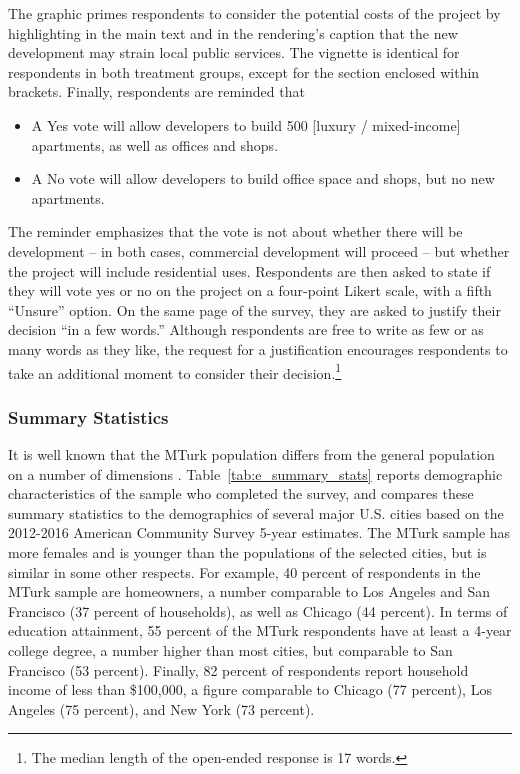 \documentclass[article,11pt]{memoir}
\begin{document}
The graphic primes respondents to consider the potential costs of the project by highlighting in the main text and in the rendering's caption that the new development may strain local public services. The vignette is identical for respondents in both treatment groups, except for the section enclosed within brackets.  Finally, respondents are reminded that

\begin{itemize}
  \item A Yes vote will allow developers to build 500 [luxury / mixed-income] apartments, as well as offices and shops.
  \item A No vote will allow developers to build office space and shops, but no new apartments.
\end{itemize}

The reminder emphasizes that the vote is not about whether there will be development -- in both cases, commercial development will proceed -- but whether the project will include residential uses.  Respondents are then asked to state if they will vote yes or no on the project on a four-point Likert scale, with a fifth ``Unsure'' option.  On the same page of the survey, they are asked to justify their decision ``in a few words.'' Although respondents are free to write as few or as many words as they like, the request for a justification encourages respondents to take an additional moment to consider their decision.\footnote{The median length of the open-ended response is 17 words.}

\subsubsection{Summary Statistics}

It is well known that the MTurk population differs from the general population on a number of dimensions \citep[see e.g.][]{huff_who_2015}.  Table~\ref{tab:e_summary_stats} reports demographic characteristics of the sample who completed the survey, and compares these summary statistics to the demographics of several major U.S. cities based on the 2012-2016 American Community Survey 5-year estimates.  The MTurk sample has more females and is younger than the populations of the selected cities, but is similar in some other respects. For example, 40 percent of respondents in the MTurk sample are homeowners, a number comparable to Los Angeles and San Francisco (37 percent of households), as well as Chicago (44 percent).  In terms of education attainment, 55 percent of the MTurk respondents have at least a 4-year college degree, a number higher than most cities, but comparable to San Francisco (53 percent).  Finally, 82 percent of respondents report household income of less than \$100,000, a figure comparable to Chicago (77 percent), Los Angeles (75 percent), and New York (73 percent).
\end{document}
